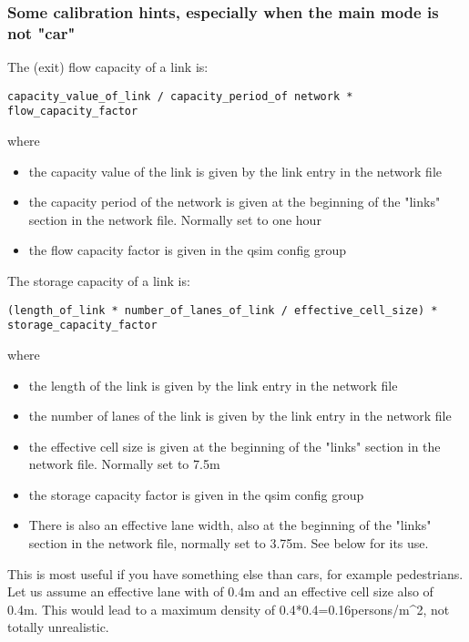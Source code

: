 \documentclass[a4paper,11pt]{report}
\begin{document}
\subsubsection{Some calibration hints, especially when the main mode is not "car"}

The (exit) flow capacity of a link is:
\begin{verbatim}
capacity_value_of_link / capacity_period_of network * flow_capacity_factor

\end{verbatim}

where
\begin{itemize}
	\item the capacity value of the link is given by the link entry in the network file
	\item the  capacity period of the network is given at the beginning of the "links"  section in the network file. Normally set to one hour
	\item the flow capacity factor is given in the qsim config group
\end{itemize}

The storage capacity of a link is:
\begin{verbatim}
(length_of_link * number_of_lanes_of_link / effective_cell_size) * storage_capacity_factor

\end{verbatim}

where
\begin{itemize}
	\item the length of the link is given by the link entry in the network file
	\item the number of lanes of the link is given by the link entry in the network file
	\item the effective cell size is given at the beginning of the "links" section in the network file. Normally set to 7.5m
	\item the storage capacity factor is given in the qsim config group
	\item There  is also an effective lane width, also at the beginning of the "links"  section in the network file, normally set to 3.75m. See below for  its use.
\end{itemize}

This is most useful if you have something else than  cars, for example pedestrians. Let us assume an effective lane  with of 0.4m and an effective cell size also of 0.4m. This would  lead to a maximum density of 0.4*0.4=0.16persons/m\textasciicircum2, not totally  unrealistic.
\end{document}
